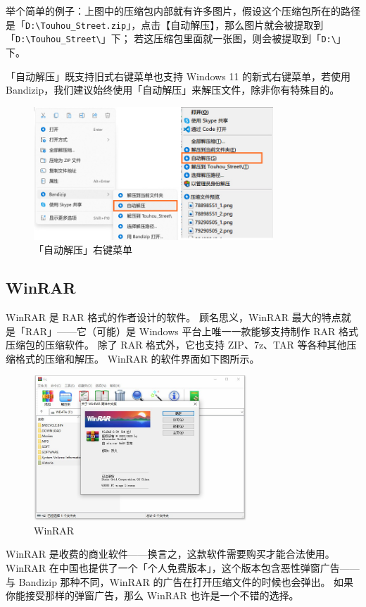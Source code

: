 举个简单的例子：上图中的压缩包内部就有许多图片，假设这个压缩包所在的路径是「\verb|D:\Touhou_Street.zip|」，点击【自动解压】，那么图片就会被提取到「\verb|D:\Touhou_Street\|」下；
若这压缩包里面就一张图，则会被提取到「\verb|D:\|」下。

「自动解压」既支持旧式右键菜单也支持 Windows 11 的新式右键菜单，若使用 Bandizip，我们建议始终使用「自动解压」来解压文件，除非你有特殊目的。

\begin{figure}[htb!]
  \centering
  \includegraphics[width=9cm]{assets/Auto_Decompress.jpg}
  \caption{「自动解压」右键菜单}
  \label{Auto_Decompress}
\end{figure}

\subsection{WinRAR}

WinRAR 是 RAR 格式的作者设计的软件。
顾名思义，WinRAR 最大的特点就是「RAR」——它（可能）是 Windows 平台上唯一一款能够支持制作 RAR 格式压缩包的压缩软件。
除了 RAR 格式外，它也支持 ZIP、7z、TAR 等各种其他压缩格式的压缩和解压。
WinRAR 的软件界面如下图所示。

\begin{figure}[htb!]
  \centering
  \includegraphics[width=8cm]{assets/WinRAR.jpg}
  \caption{WinRAR}
  \label{WinRAR}
\end{figure}

WinRAR 是收费的商业软件——换言之，这款软件需要购买才能合法使用。
WinRAR 在中国也提供了一个「个人免费版本」，这个版本包含恶性弹窗广告——与 Bandizip 那种不同，WinRAR 的广告在打开压缩文件的时候也会弹出。
如果你能接受那样的弹窗广告，那么 WinRAR 也许是一个不错的选择。

